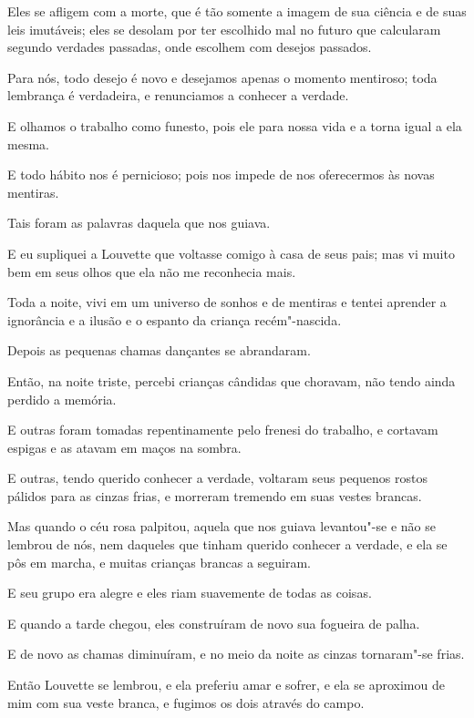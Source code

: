Eles se afligem com a morte, que é tão somente a imagem de sua ciência
e de suas leis imutáveis; eles se desolam por ter escolhido mal no futuro
que calcularam segundo verdades passadas, onde escolhem com desejos
passados.

Para nós, todo desejo é novo e desejamos apenas o momento mentiroso;
toda lembrança é verdadeira, e renunciamos a conhecer a verdade.

E olhamos o trabalho como funesto, pois ele para nossa vida e a torna
igual a ela mesma.

E todo hábito nos é pernicioso; pois nos impede de nos oferecermos às
novas mentiras.

Tais foram as palavras daquela que nos guiava.

E eu supliquei a Louvette que voltasse comigo à casa de seus pais; mas
vi muito bem em seus olhos que ela não me reconhecia mais.

Toda a noite, vivi em um universo de sonhos e de mentiras e tentei
aprender a ignorância e a ilusão e o espanto da criança recém"-nascida.

Depois as pequenas chamas dançantes se abrandaram.

Então, na noite triste, percebi crianças cândidas que choravam, não
tendo ainda perdido a memória.

E outras foram tomadas repentinamente pelo frenesi do trabalho, e
cortavam espigas e as atavam em maços na sombra.

E outras, tendo querido conhecer a verdade, voltaram seus pequenos
rostos pálidos para as cinzas frias, e morreram tremendo em suas vestes
brancas.

Mas quando o céu rosa palpitou, aquela que nos guiava levantou"-se e não
se lembrou de nós, nem daqueles que tinham querido conhecer a verdade, e
ela se pôs em marcha, e muitas crianças brancas a seguiram.

E seu grupo era alegre e eles riam suavemente de todas as coisas.

E quando a tarde chegou, eles construíram de novo sua fogueira de
palha.

E de novo as chamas diminuíram, e no meio da noite as cinzas
tornaram"-se frias.

Então Louvette se lembrou, e ela preferiu amar e sofrer, e ela se aproximou 
de mim com sua veste branca, e fugimos os dois através do campo.

